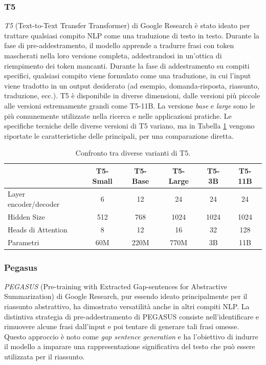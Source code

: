 \documentclass[12pt,a4paper,twoside,openright]{book}
\begin{document}
\subsubsection{T5}
\emph{T5} (Text-to-Text Transfer Transformer) \cite{DBLP:journals/corr/abs-1910-10683} di Google Research è stato ideato per trattare qualsiasi compito NLP come una traduzione di testo in testo. Durante la fase di pre-addestramento, il modello apprende a tradurre frasi con token mascherati nella loro versione completa, addestrandosi in un'ottica di riempimento dei token mancanti. Durante la fase di addestramento su compiti specifici, qualsiasi compito viene formulato come una traduzione, in cui l'input viene tradotto in un output desiderato (ad esempio, domanda-risposta, riassunto, traduzione, ecc.). T5 è disponibile in diverse dimensioni, dalle versioni più piccole alle versioni estremamente grandi come T5-11B. La versione \emph{base} e \emph{large} sono le più comunemente utilizzate nella ricerca e nelle applicazioni pratiche. Le specifiche tecniche delle diverse versioni di T5 variano, ma in Tabella \ref{tab:t5-comparison} vengono riportate le caratteristiche delle principali, per una comparazione diretta.

\begin{table}
\centering
\begin{tabular}{|l|c|c|c|c|c|}
\hline
& T5-Small & T5-Base & T5-Large & T5-3B & T5-11B \\ \hline
Layer encoder/decoder & 6 & 12 & 24 & 24 & 24 \\ 
Hidden Size & 512 & 768 & 1024 & 1024 & 1024 \\ 
Heads di Attention & 8 & 12 & 16 & 32 & 128 \\ 
Parametri & 60M & 220M & 770M & 3B & 11B \\ \hline
\end{tabular}
\caption{Confronto tra diverse varianti di T5.}
\label{tab:t5-comparison}
\end{table}


\subsubsection{Pegasus}
\emph{PEGASUS} (Pre-training with Extracted Gap-sentences for Abstractive Summarization) \cite{DBLP:journals/corr/abs-1912-08777} di Google Research, pur essendo ideato principalmente per il riassunto abstrattivo, ha dimostrato versatilità anche in altri compiti NLP. La distintiva strategia di pre-addestramento di PEGASUS consiste nell'identificare e rimuovere alcune frasi dall'input e poi tentare di generare tali frasi omesse. Questo approccio è noto come \emph{gap sentence generation} e ha l'obiettivo di indurre il modello a imparare una rappresentazione significativa del testo che può essere utilizzata per il riassunto.
\end{document}
